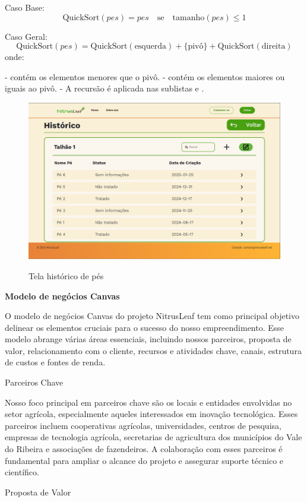 Caso Base:
\[
\text{QuickSort}(pes) = pes \quad \text{se} \quad \text{tamanho}(pes) \leq 1
\]

Caso Geral:
\[
\text{QuickSort}(pes) = \text{QuickSort}(\text{esquerda}) + \{ \text{pivô} \} + \text{QuickSort}(\text{direita})
\]
onde:

-  contém os elementos menores que o pivô.
-  contém os elementos maiores ou iguais ao pivô.
- A recursão é aplicada nas sublistas  e .
   
\begin{figure}[H]
\centering
\caption{Tela histórico de pés}
\includegraphics[width=0.7\linewidth]{Illustrations/tela_hist.png}
\label{fig:tela-alg}
\end{figure}

\textbf{Modelo de negócios Canvas}
    
    O modelo de negócios Canvas do projeto NitrusLeaf  tem como principal objetivo delinear os elementos cruciais para o sucesso do nosso empreendimento. Esse modelo abrange várias áreas essenciais, incluindo nossos parceiros, proposta de valor, relacionamento com o cliente, recursos e atividades chave, canais, estrutura de custos e fontes de renda.
    
    Parceiros Chave
    
    Nosso foco principal em parceiros chave são os locais e entidades envolvidas no setor agrícola, especialmente aqueles interessados em inovação tecnológica. Esses parceiros incluem cooperativas agrícolas, universidades, centros de pesquisa, empresas de tecnologia agrícola, secretarias de agricultura dos municípios do Vale do Ribeira e associações de fazendeiros. A colaboração com esses parceiros é fundamental para ampliar o alcance do projeto e assegurar suporte técnico e científico.
    
    Proposta de Valor
    
